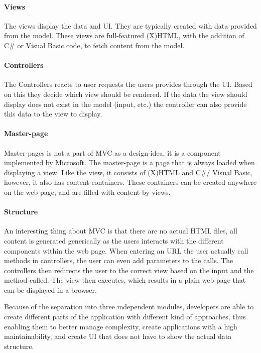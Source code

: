 \paragraph{Views}
The views display the data and UI. They are typically created with data provided from the model. These views are full-featured (X)HTML, with the addition of C\# or Visual Basic code, to fetch content from the model.

\paragraph{Controllers}
The Controllers reacts to user requests the users provides through the UI. Based on this they decide which view should be rendered. If the data the view should display does not exist in the model (input, etc.) the controller can also provide this data to the view to display.

\paragraph{Master-page}
Master-pages is not a part of MVC as a design-idea, it is a component implemented by Microsoft. The master-page is a page that is always loaded when displaying a view. Like the view, it consists of (X)HTML and C\#/ Visual Basic, however, it also has content-containers. These containers can be created anywhere on the web page, and are filled with content by views.

\paragraph{Structure}
An interesting thing about MVC is that there are no actual HTML files, all content is generated generically as the users interacts with the different components within the web page. When entering an URL the user actually call methods in controllers, the user can even add parameters to the calls. The controllers then redirects the user to the correct view based on the input and the method called. The view then executes, which results in a plain web page that can be displayed in a browser.

Because of the separation into three independent modules, developers are able to create different parts of the application with different kind of approaches, thus enabling them to better manage complexity, create applications with a high maintainability, and create UI that does not have to show the actual data structure.

